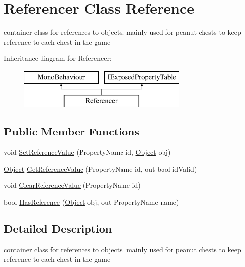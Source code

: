 \hypertarget{class_referencer}{}\section{Referencer Class Reference}
\label{class_referencer}


container class for references to objects. mainly used for peanut chests to keep reference to each chest in the game  


Inheritance diagram for Referencer\+:\begin{figure}[H]
\begin{center}
\leavevmode
\includegraphics[height=2.000000cm]{class_referencer}
\end{center}
\end{figure}
\subsection*{Public Member Functions}
\begin{DoxyCompactItemize}
\item 
void \mbox{\hyperlink{class_referencer_a162fa767f7bd9e01f760ed2ee7c5b8a7}{Set\+Reference\+Value}} (Property\+Name id, \mbox{\hyperlink{_quads_8cs_aef19bab18b9814edeef255c43e4f6bbc}{Object}} obj)
\item 
\mbox{\hyperlink{_quads_8cs_aef19bab18b9814edeef255c43e4f6bbc}{Object}} \mbox{\hyperlink{class_referencer_a7cccef95dcda0f059d47bcccacac34ae}{Get\+Reference\+Value}} (Property\+Name id, out bool id\+Valid)
\item 
void \mbox{\hyperlink{class_referencer_a09d24644a0d18f9a5741b35b949e19fc}{Clear\+Reference\+Value}} (Property\+Name id)
\item 
bool \mbox{\hyperlink{class_referencer_a1c445113d8018bc411921def43512510}{Has\+Reference}} (\mbox{\hyperlink{_quads_8cs_aef19bab18b9814edeef255c43e4f6bbc}{Object}} obj, out Property\+Name name)
\end{DoxyCompactItemize}


\subsection{Detailed Description}
container class for references to objects. mainly used for peanut chests to keep reference to each chest in the game 



